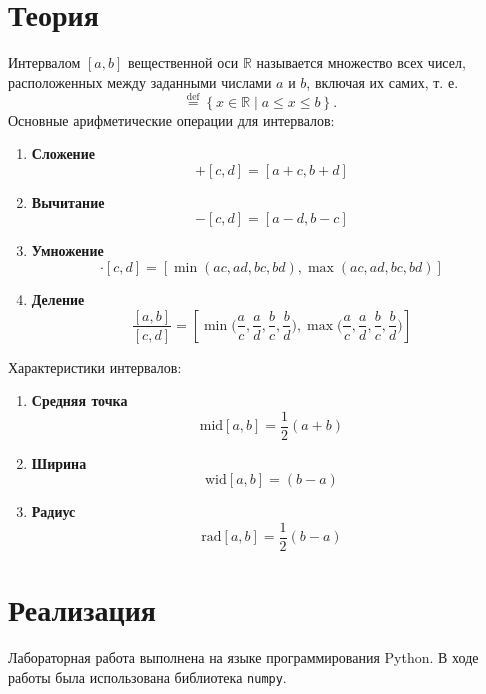 \documentclass[a4paper,14pt]{article}
\begin{document}
	\section{Теория}
	Интервалом $[a, b]$ вещественной оси $\mathbb{R}$ называется множество всех чисел, расположенных между заданными числами $a$ и $b$, включая их самих, т. е.
	\begin{equation}
		[a, b] \stackrel{\text{def}}{=}
		\left \{ x \in \mathbb{R} \mid a \leqslant x \leqslant b \right \}.
	\end{equation}
	Основные арифметические операции для интервалов:
	\begin{enumerate}
		\item \textbf{Сложение}
		\begin{equation}
			[a, b] + [c, d] = [a+c, b+d]
		\end{equation}
		\item \textbf{Вычитание}	
		\begin{equation}
			[a, b] - [c, d] = [a-d, b-c]
		\end{equation}
		\item \textbf{Умножение}
		\begin{equation}
			[a, b] \cdot [c, d] = [\min(ac, ad, bc, bd), \max(ac, ad, bc, bd)]
		\end{equation}
		\item \textbf{Деление}
		\begin{equation}
			\frac{[a,b]}{[c,d]}=[\min\Big(\frac{a}{c}, \frac{a}{d}, \frac{b}{c}, \frac{b}{d}\Big), \max\Big(\frac{a}{c}, \frac{a}{d}, \frac{b}{c}, \frac{b}{d}\Big)]
		\end{equation}
	\end{enumerate}

	Характеристики интервалов:
	\begin{enumerate}
		\item \textbf{Средняя точка}
		\begin{equation}
			\text{mid}[a,b] = \frac{1}{2}(a+b)
		 \end{equation}
		\item \textbf{Ширина}
		\begin{equation}
			\text{wid}[a,b] = (b-a)
		\end{equation}
		\item \textbf{Радиус}
		\begin{equation}
			\text{rad}[a,b] = \frac{1}{2}(b-a)
		\end{equation}
	\end{enumerate}
	\section{Реализация}
	Лабораторная работа выполнена на языке программирования Python. В ходе
  работы была использована библиотека \verb!numpy!.
\end{document}
